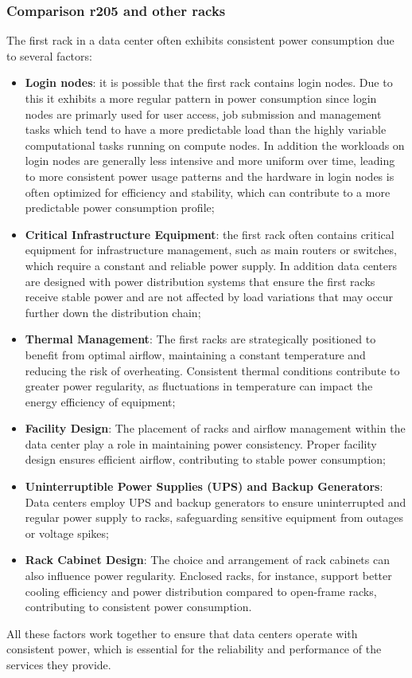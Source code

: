 \subsubsection{Comparison r205 and other racks}
The first rack in a data center often exhibits consistent power consumption due to several factors:
\begin{itemize}
    \item \textbf{Login nodes}: it is possible that the first rack contains login nodes. Due to this it exhibits a more regular pattern in power consumption since login nodes are primarly used for user access, job submission and management tasks which tend to have a more predictable load than the highly variable computational tasks running on compute nodes. In addition the workloads on login nodes are generally less intensive and more uniform over time, leading to more consistent power usage patterns and the hardware in login nodes is often optimized for efficiency and stability, which can contribute to a more predictable power consumption profile;
    \item \textbf{Critical Infrastructure Equipment}: the first rack often contains critical equipment for infrastructure management, such as main routers or switches, which require a constant and reliable power supply. In addition data centers are designed with power distribution systems that ensure the first racks receive stable power and are not affected by load variations that may occur further down the distribution chain;
    \item \textbf{Thermal Management}: The first racks are strategically positioned to benefit from optimal airflow, maintaining a constant temperature and reducing the risk of overheating. Consistent thermal conditions contribute to greater power regularity, as fluctuations in temperature can impact the energy efficiency of equipment;
    \item \textbf{Facility Design}: The placement of racks and airflow management within the data center play a role in maintaining power consistency. Proper facility design ensures efficient airflow, contributing to stable power consumption;
    \item \textbf{Uninterruptible Power Supplies (UPS) and Backup Generators}: Data centers employ UPS and backup generators to ensure uninterrupted and regular power supply to racks, safeguarding sensitive equipment from outages or voltage spikes;
    \item \textbf{Rack Cabinet Design}: The choice and arrangement of rack cabinets can also influence power regularity. Enclosed racks, for instance, support better cooling efficiency and power distribution compared to open-frame racks, contributing to consistent power consumption.
\end{itemize}
All these factors work together to ensure that data centers operate with consistent power, which is essential for the reliability and performance of the services they provide.
\clearpage

